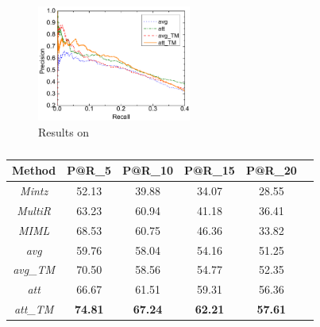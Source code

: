 \begin{figure}[t!]
\includegraphics[width=0.45\textwidth]{figures/re_att_avg_cmp_exp.pdf}
\caption{Results on \EntityRE}
\label{fig: Riedel_res}
\end{figure}



\begin{table}
\centering
\small{
\begin{tabular}{|c|c|c|c|c|c|}
\hline
\textbf{Method}							& \textbf{P@R\_5} 		& \textbf{P@R\_10} 			& \textbf{P@R\_15} & \textbf{P@R\_20} \\
\hline
\textit{Mintz} 							&52.13	&39.88	&34.07	&28.55 	\\
\hline
\textit{MultiR} 						&63.23	&60.94	&41.18	&36.41 	\\
\hline
\textit{MIML} 							&68.53	&60.75	&46.36	&33.82 	\\
\hline
\textit{avg} 								&59.76	&58.04	&54.16	&51.25 	\\
\hline
\textit{avg\_TM} 						&70.50	&58.56	&54.77	&52.35 	\\
\hline
\textit{att} 								&66.67	&61.51	&59.31	&56.36 	\\
\hline
\textit{att\_TM} 						&\textbf{74.81}	&\textbf{67.24}	&\textbf{62.21}	&\textbf{57.61} 	\\
\hline
\end{tabular}
}
\caption{}
\label{feature-based}
\vspace{-1em}
\end{table}


